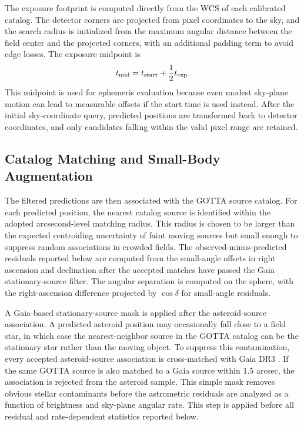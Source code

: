 \documentclass[referee]{raa}
\begin{document}
The exposure footprint is computed directly from the WCS of each calibrated catalog. The detector corners are projected from pixel coordinates to the sky, and the search radius is initialized from the maximum angular distance between the field center and the projected corners, with an additional padding term to avoid edge losses. The exposure midpoint is
\begin{equation}
t_{\rm mid}=t_{\rm start}+\frac{1}{2}t_{\rm exp}.
\end{equation}
This midpoint is used for ephemeris evaluation because even modest sky-plane motion can lead to measurable offsets if the start time is used instead. After the initial sky-coordinate query, predicted positions are transformed back to detector coordinates, and only candidates falling within the valid pixel range are retained.

\subsection{Catalog Matching and Small-Body Augmentation}

The filtered predictions are then associated with the GOTTA source catalog. For each predicted position, the nearest catalog source is identified within the adopted arcsecond-level matching radius. This radius is chosen to be larger than the expected centroiding uncertainty of faint moving sources but small enough to suppress random associations in crowded fields. The observed-minus-predicted residuals reported below are computed from the small-angle offsets in right ascension and declination after the accepted matches have passed the Gaia stationary-source filter. The angular separation is computed on the sphere, with the right-ascension difference projected by \(\cos\delta\) for small-angle residuals.

A Gaia-based stationary-source mask is applied after the asteroid-source association. A predicted asteroid position may occasionally fall close to a field star, in which case the nearest-neighbor source in the GOTTA catalog can be the stationary star rather than the moving object. To suppress this contamination, every accepted asteroid-source association is cross-matched with Gaia DR3 \citep{Gaia2023}. If the same GOTTA source is also matched to a Gaia source within 1.5 arcsec, the association is rejected from the asteroid sample. This simple mask removes obvious stellar contaminants before the astrometric residuals are analyzed as a function of brightness and sky-plane angular rate. This step is applied before all residual and rate-dependent statistics reported below.
\end{document}

